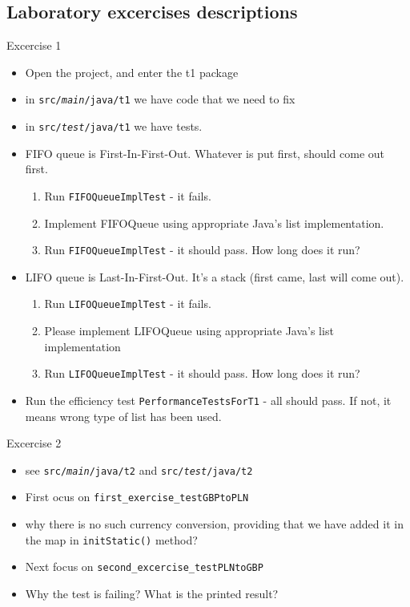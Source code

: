 \documentclass{beamer}
\begin{document}
\subsection{Laboratory excercises descriptions}


\begin{frame}[fragile]{Excercise 1}

\begin{itemize}
	\item Open the project, and enter the t1 package
    \item in \texttt{src/\textit{main}/java/t1} we have code that we need to fix
    \item in \texttt{src/\textit{test}/java/t1} we have tests. \pause
    \item FIFO queue is First-In-First-Out. Whatever is put first, should come out first. \pause
    \begin{enumerate}
        \item Run \texttt{FIFOQueueImplTest} - it fails.\pause
        \item Implement FIFOQueue using appropriate Java's list implementation.\pause
        \item Run \texttt{FIFOQueueImplTest} - it should pass. How long does it run?\pause
    \end{enumerate}
    \item LIFO queue is Last-In-First-Out. It's a stack (first came, last will come out).\pause
    \begin{enumerate}
        \item Run \texttt{LIFOQueueImplTest} - it fails.\pause
        \item Please implement LIFOQueue using appropriate Java's list implementation\pause
        \item Run \texttt{LIFOQueueImplTest} - it should pass. How long does it run?\pause
    \end{enumerate}
    \item Run the efficiency test \texttt{PerformanceTestsForT1} - all should pass. If not, it means wrong type of list has been used.
\end{itemize}
\end{frame}

\begin{frame}{Excercise 2}

\begin{itemize}
    \item see \texttt{src/\textit{main}/java/t2} and \texttt{src/\textit{test}/java/t2}
    \item First ocus on \texttt{first\_exercise\_testGBPtoPLN}
    \item why there is no such currency conversion, providing that we have added it in the map in \texttt{initStatic()} method?
    \item Next focus on \texttt{second\_excercise\_testPLNtoGBP}
    \item Why the test is failing? What is the printed result?
\end{itemize}
\end{frame}
\end{document}
